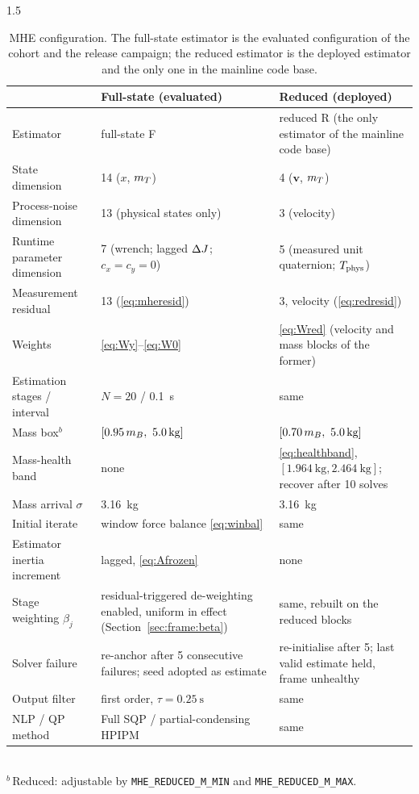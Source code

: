 \begin{appendices}
\begin{spacing}{1.5}
\begin{table}[ht]
\centering
\caption{MHE configuration. The full-state estimator is the evaluated
configuration of the cohort and the release campaign; the reduced estimator is
the deployed estimator and the only one in the mainline code base.}
\small
\begin{tabularx}{\textwidth}{@{}p{} X X@{}}
\toprule
 & \textbf{Full-state (evaluated)} & \textbf{Reduced (deployed)} \\
\midrule
Estimator & full-state F & reduced R (the only estimator of the mainline code base) \\
State dimension & 14 ($x$, $m_T$) & 4 ($\bm v$, $m_T$) \\
Process-noise dimension & 13 (physical states only) & 3 (velocity) \\
Runtime parameter dimension & 7 (wrench; lagged $\Delta J$; $c_x=c_y=0$) & 5 (measured unit quaternion; $T_{\mathrm{phys}}$) \\
Measurement residual & 13 (\eqref{eq:mheresid}) & 3, velocity (\eqref{eq:redresid}) \\
Weights & \eqref{eq:Wy}--\eqref{eq:W0} & \eqref{eq:Wred} (velocity and mass blocks of the former) \\
Estimation stages / interval & $N=20$ / \SI{0.1}{\second} & same \\
Mass box$^{b}$ & $[0.95\,\mB,\ \SI{5.0}{\kg}]$ & $[0.70\,\mB,\ \SI{5.0}{\kg}]$ \\
Mass-health band & none & \eqref{eq:healthband}, $[\SI{1.964}{\kg},\SI{2.464}{\kg}]$; recover after 10 solves \\
Mass arrival $\sigma$ & \SI{3.16}{\kg} & \SI{3.16}{\kg} \\
Initial iterate & window force balance \eqref{eq:winbal} & same \\
Estimator inertia increment & lagged, \eqref{eq:Afrozen} & none \\
Stage weighting $\beta_j$ & residual-triggered de-weighting enabled, uniform in effect (Section~\ref{sec:frame:beta}) & same, rebuilt on the reduced blocks \\
Solver failure & re-anchor after 5 consecutive failures; seed adopted as estimate & re-initialise after 5; last valid estimate held, frame unhealthy \\
Output filter & first order, $\tau=\SI{0.25}{\second}$ & same \\
NLP / QP method & Full SQP / partial-condensing HPIPM & same \\
\bottomrule
\end{tabularx}
\\[3pt]
{\footnotesize $^{b}$\,Reduced: adjustable by \texttt{MHE\_REDUCED\_M\_MIN} and \texttt{MHE\_REDUCED\_M\_MAX}.}
\end{table}


\end{spacing}
\end{appendices}
